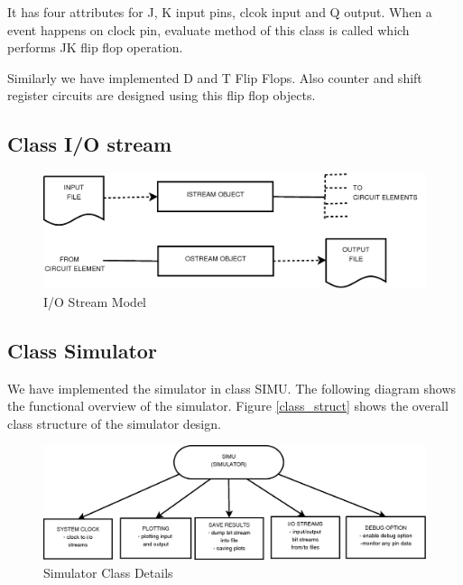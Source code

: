 \documentclass[a4paper,12pt]{article}
\begin{document}


It has four attributes for J, K input pins, clcok input and Q output. When a event happens on clock pin, evaluate method of this class is called 
which performs JK flip flop operation.

Similarly we have implemented D and T Flip Flops. Also counter and shift register circuits are designed using this flip flop objects.


\subsection{Class I/O stream }


\begin{figure}[h]
   \begin{center}
   \includegraphics[scale=0.3]{iostream.png}
    \caption{{I/O Stream Model}}
  \label{iostream}
  \end{center}
  \end{figure}
 

\subsection{Class Simulator}
We have implemented the simulator in class SIMU. The following diagram shows the functional overview of the simulator. Figure \ref{class_struct}  shows the overall class structure of the simulator design. 

\begin{figure}[h]
   \begin{center}
   \includegraphics[scale=0.35]{simu_model.png}
    \caption{{Simulator Class Details}}
  \label{simu_class}
  \end{center}
  \end{figure}
\end{document}
